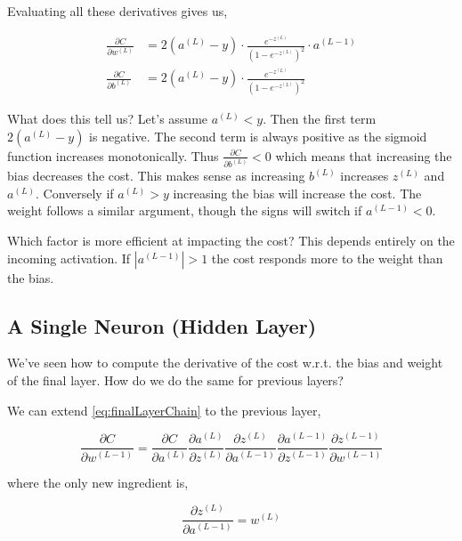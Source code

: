 \documentclass{article}
\begin{document}
\noindent
Evaluating all these derivatives gives us,

\begin{align}
    \frac{\partial C}{\partial w^{(L)}} &= 2(a^{(L)} - y) \cdot \frac{e^{-z^{(L)}}}{(1 - e^{-z^{(L)}})^2} \cdot a^{(L - 1)} \\
    \frac{\partial C}{\partial b^{(L)}} &= 2(a^{(L)} - y) \cdot \frac{e^{-z^{(L)}}}{(1 - e^{-z^{(L)}})^2}
\end{align}

What does this tell us? Let's assume $a^{(L)} < y$. Then the first term $2(a^{(L)} - y)$ is negative. The second term is always positive as the sigmoid function increases monotonically. Thus $\frac{\partial C}{\partial b^{(L)}} < 0$ which means that increasing the bias decreases the cost. This makes sense as increasing $b^{(L)}$ increases $z^{(L)}$ and $a^{(L)}$. Conversely if $a^{(L)} > y$ increasing the bias will increase the cost.
The weight follows a similar argument, though the signs will switch if $a^{(L - 1)} < 0$.

Which factor is more efficient at impacting the cost? This depends entirely on the incoming activation. If $|a^{(L - 1)}| > 1$ the cost responds more to the weight than the bias.


\subsection{A Single Neuron (Hidden Layer)}

We've seen how to compute the derivative of the cost w.r.t. the bias and weight of the final layer. How do we do the same for previous layers?

We can extend \autoref{eq:finalLayerChain} to the previous layer,

\begin{equation}
    \frac{\partial C}{\partial w^{(L - 1)}} =
        \frac{\partial C}{\partial a^{(L)}}
        \frac{\partial a^{(L)}}{\partial z^{(L)}}
        \frac{\partial z^{(L)}}{\partial a^{(L - 1)}}
        \frac{\partial a^{(L - 1)}}{\partial z^{(L - 1)}}
        \frac{\partial z^{(L - 1)}}{\partial w^{(L - 1)}}
    \label{}
\end{equation}

\noindent
where the only new ingredient is,

\begin{equation}
    \frac{\partial z^{(L)}}{\partial a^{(L - 1)}} = w^{(L)}
\end{equation}
\end{document}

